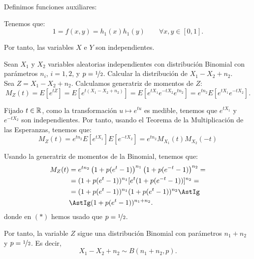 \begin{ejercicio}
\begin{enumerate}
        Definimos funciones auxiliares:

        Tenemos que:
        \begin{equation*}
            1=f(x,y)=h_1(x)h_1(y) \qquad \forall x,y\in [0,1].
        \end{equation*}

        Por tanto, las variables $X$ e $Y$ son independientes.
    \end{enumerate}
\end{ejercicio}

\begin{ejercicio}
    Sean $X_1$ y $X_2$ variables aleatorias independientes con distribución Binomial con parámetros $n_i$, $i = 1,2$, y $p = \nicefrac{1}{2}$. Calcular la distribución de $X_1 - X_2 + n_2$.\\

    Sea $Z=X_1-X_2+n_2$. Calculamos generatriz de momentos de $Z$:
    \begin{equation*}
        M_Z(t) = E[e^{tZ}] = E[e^{t(X_1-X_2+n_2)}] = E[e^{tX_1}e^{-tX_2}e^{tn_2}] = e^{tn_2}E[e^{tX_1}e^{-tX_2}].
    \end{equation*}

    Fijado $t\in \mathbb{R}$, como la transformación $u\mapsto e^{tu}$ es medible, tenemos que $e^{tX_1}$ y $e^{-tX_2}$ son independientes. Por tanto, usando el Teorema de la Multiplicación de las Esperanzas, tenemos que:
    \begin{equation*}
        M_Z(t) = e^{tn_2}E[e^{tX_1}]E[e^{-tX_2}] = e^{tn_2}M_{X_1}(t)M_{X_2}(-t)
    \end{equation*}

    Usando la generatriz de momentos de la Binomial, tenemos que:
    \begin{align*}
        M_Z(t) &= e^{tn_2}\left(1+p(e^t-1)\right)^{n_1}\left(1+p(e^{-t}-1)\right)^{n_2} =\\
        &=(1+p(e^t-1))^{n_1}[e^t(1+p(e^{-t}-1))]^{n_2}=\\
        &=(1+p(e^t-1))^{n_1}(1+p(e^{t}-1))^{n_2}
        \AstIg\\&\AstIg
        (1+p(e^t-1))^{n_1+n_2}.
    \end{align*}
    donde en $(\ast)$ hemos usado que $p=\nicefrac{1}{2}$.

    Por tanto, la variable $Z$ sigue una distribución Binomial con parámetros $n_1+n_2$ y $p=\nicefrac{1}{2}$. Es decir,
    \begin{equation*}
        X_1-X_2+n_2\sim B(n_1+n_2,p).
    \end{equation*}
\end{ejercicio}

